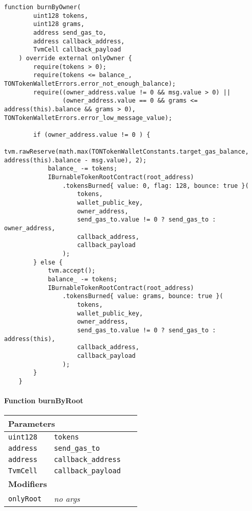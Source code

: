 \begin{lstlisting}[firstnumber=473]
    function burnByOwner(
        uint128 tokens,
        uint128 grams,
        address send_gas_to,
        address callback_address,
        TvmCell callback_payload
    ) override external onlyOwner {
        require(tokens > 0);
        require(tokens <= balance_, TONTokenWalletErrors.error_not_enough_balance);
        require((owner_address.value != 0 && msg.value > 0) ||
                (owner_address.value == 0 && grams <= address(this).balance && grams > 0), TONTokenWalletErrors.error_low_message_value);

        if (owner_address.value != 0 ) {
            tvm.rawReserve(math.max(TONTokenWalletConstants.target_gas_balance, address(this).balance - msg.value), 2);
            balance_ -= tokens;
            IBurnableTokenRootContract(root_address)
                .tokensBurned{ value: 0, flag: 128, bounce: true }(
                    tokens,
                    wallet_public_key,
                    owner_address,
                    send_gas_to.value != 0 ? send_gas_to : owner_address,
                    callback_address,
                    callback_payload
                );
        } else {
            tvm.accept();
            balance_ -= tokens;
            IBurnableTokenRootContract(root_address)
                .tokensBurned{ value: grams, bounce: true }(
                    tokens,
                    wallet_public_key,
                    owner_address,
                    send_gas_to.value != 0 ? send_gas_to : address(this),
                    callback_address,
                    callback_payload
                );
        }
    }
\end{lstlisting}

\paragraph{Function burnByRoot}


\ifsoltables
\noindent\begin{tabular}{|l|l|p{5cm}|}\hline
\multicolumn{3}{|l|}{\bf Parameters}\\\hline
\tt uint128 & \tt tokens &\\\hline
\tt address & \tt send\_{}gas\_{}to &\\\hline
\tt address & \tt callback\_{}address &\\\hline
\tt TvmCell & \tt callback\_{}payload &\\\hline
\multicolumn{3}{|l|}{\bf Modifiers}\\\hline
\tt onlyRoot & {\em no args} &\\\hline
\end{tabular}
\fi

